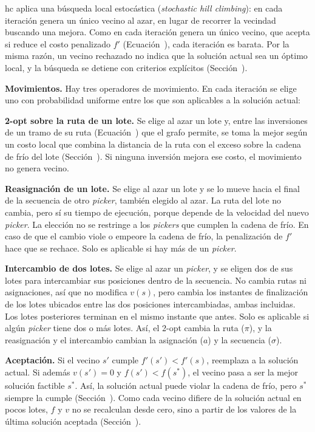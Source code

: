 \ac{hc} aplica una búsqueda local estocástica ({\em stochastic hill
climbing}): en cada iteración genera un único vecino al azar, en lugar de
recorrer la vecindad buscando una mejora. Como en cada iteración genera un
único vecino, que acepta si reduce el costo penalizado $f'$
(Ecuación~\in[eq:hc_costo]), cada iteración es barata. Por la misma razón, un
vecino rechazado no indica que la solución actual sea un óptimo local, y la
búsqueda se detiene con criterios explícitos (Sección~).

{\bf Movimientos.} Hay tres operadores de movimiento. En cada iteración se
elige uno con probabilidad uniforme entre los que son aplicables a la
solución actual:
\startitemize[n]
	\item {\bf 2-opt sobre la ruta de un lote.} Se elige al azar un lote y,
	entre las inversiones de un tramo de su ruta (Ecuación~\in[eq:2opt]) que el grafo permite, se toma la mejor según un
	costo local que combina la distancia de la ruta con el exceso sobre la
	cadena de frío del lote (Sección~). Si ninguna
	inversión mejora ese costo, el movimiento no genera vecino.
	\item {\bf Reasignación de un lote.} Se elige al azar un lote
	y se lo mueve hacia el final de la secuencia de otro {\em picker}, también elegido al azar.
	La ruta del lote no cambia, pero sí su tiempo de
	ejecución, porque depende de la velocidad del nuevo {\em picker}. La
	elección no se restringe a los {\em pickers} que cumplen
	la cadena de frío. En caso de que el cambio viole o empeore
	la cadena de frío, la penalización de $f'$ hace que se rechace.
	Solo es aplicable si hay más de un {\em picker}.
	\item {\bf Intercambio de dos lotes.} Se elige al azar un {\em picker},
	y se eligen dos de sus lotes para intercambiar sus posiciones dentro de
	la secuencia. No cambia rutas ni asignaciones,
	así que no modifica $v(s)$, pero cambia los instantes de finalización de
	los lotes ubicados entre las dos posiciones intercambiadas, ambas incluidas. Los lotes
	posteriores terminan en el mismo instante que antes. Solo es aplicable si algún
	{\em picker} tiene dos o más lotes.
\stopitemize
Así, el 2-opt cambia la ruta ($\pi$), y la reasignación y el intercambio
cambian la asignación ($a$) y la secuencia ($\sigma$).

{\bf Aceptación.} Si el vecino $s'$ cumple $f'(s') < f'(s)$, reemplaza a la
solución actual. Si además $v(s') = 0$ y $f(s') < f(s^*)$, el vecino
pasa a ser la mejor solución factible $s^*$. Así, la solución actual
puede violar la cadena de frío, pero $s^*$ siempre la cumple
(Sección~). Como cada vecino difiere de la solución
actual en pocos lotes, $f$ y $v$ no se recalculan desde cero, sino a partir
de los valores de la última solución aceptada
(Sección~).

